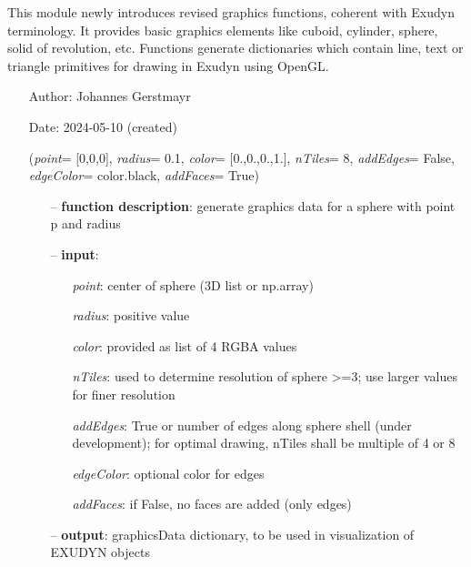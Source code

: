 \begin{itemize}[leftmargin=1.4cm]
\begin{itemize}[leftmargin=1.4cm]
\begin{itemize}[leftmargin=1.4cm]
\begin{itemize}[leftmargin=0.5cm]
\begin{itemize}[leftmargin=1.4cm]
\begin{itemize}[leftmargin=1.4cm]
\begin{itemize}[leftmargin=0.5cm]
\ei

%
\label{sec:module:graphics}
  This module newly introduces revised graphics functions, coherent with Exudyn terminology.
           It provides basic graphics elements like cuboid, cylinder, sphere, solid of revolution, etc. 
           Functions generate dictionaries which contain line, text or triangle primitives for drawing in Exudyn using OpenGL.
\begin{itemize}[leftmargin=1.4cm]
\setlength{\itemindent}{-1.4cm}
\item[]Author:    Johannes Gerstmayr
\item[]Date:      2024-05-10 (created)
\ei
\begin{flushleft}
\label{sec:graphics:Sphere}
({\it point}= [0,0,0], {\it radius}= 0.1, {\it color}= [0.,0.,0.,1.], {\it nTiles}= 8, {\it addEdges}= False, {\it edgeColor}= color.black, {\it addFaces}= True)
\end{flushleft}
\setlength{\itemindent}{0.7cm}
\begin{itemize}[leftmargin=0.7cm]
\item[--]
{\bf function description}: generate graphics data for a sphere with point p and radius
\item[--]
{\bf input}: \vspace{-6pt}
\begin{itemize}[leftmargin=1.2cm]
\setlength{\itemindent}{-0.7cm}
\item[]{\it point}: center of sphere (3D list or np.array)
\item[]{\it radius}: positive value
\item[]{\it color}: provided as list of 4 RGBA values
\item[]{\it nTiles}: used to determine resolution of sphere >=3; use larger values for finer resolution
\item[]{\it addEdges}: True or number of edges along sphere shell (under development); for optimal drawing, nTiles shall be multiple of 4 or 8
\item[]{\it edgeColor}: optional color for edges
\item[]{\it addFaces}: if False, no faces are added (only edges)
\end{itemize}
\item[--]
{\bf output}: graphicsData dictionary, to be used in visualization of EXUDYN objects
\vspace{12pt}\end{itemize}

\end{itemize}
\end{itemize}
\end{itemize}
\end{itemize}
\end{itemize}
\end{itemize}
\end{itemize}
\end{itemize}
